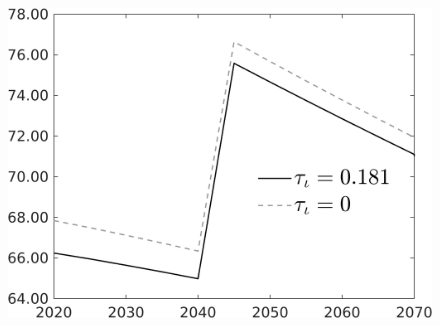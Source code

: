 \documentclass[12pt]{article}
\begin{document}
\begin{figure}[h!!]
\begin{minipage}[]{0.32\textwidth}
	\end{minipage}	
	\begin{minipage}[]{0.32\textwidth}
		\includegraphics[width=1\textwidth]{../../codding_model/own_basedOnFried/optimalPol_010922_revision/figures/all_13Sept22/CompTauf_bytaul_Reg0_gAg_spillover0_nsk0_xgr0_knspil1_sep1_LFlimit1_emsbase0_countec0_GovRev0_etaa0.79_lgd1.png}
	\end{minipage}	
\end{figure}
\end{document}
